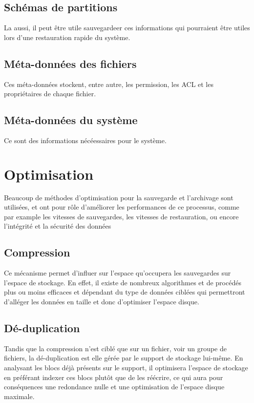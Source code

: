\documentclass[a4paper,11pt]{report}
\begin{document}
\subsection{Schémas de partitions}
La aussi, il peut être utile sauvegardeer ces informations qui pourraient être utiles lors d'une restauration rapide du système.

\subsection{Méta-données des fichiers}
Ces méta-données stockent, entre autre, les permission, les ACL et les propriétaires de chaque fichier. 

\subsection{Méta-données du système}
Ce sont des informations nécéessaires pour le système.

\section{Optimisation}
Beaucoup de méthodes d'optimisation pour la sauvegarde et l'archivage sont utilisées, et ont pour rôle d'améliorer les performances de ce processus, comme par example les vitesses de sauvegardes, les vitesses de restauration, ou encore l'intégrité et la sécurité des données

\subsection{Compression}
Ce mécanisme permet d'influer sur l'espace qu'occupera les sauvegardes sur l'espace de stockage. 
En effet, il existe de nombreux algorithmes et de procédés plus ou moins efficaces et dépendant du type de données ciblées qui permettront d'alléger les données en taille et donc d'optimiser l'espace disque.

\subsection{Dé-duplication}
Tandis que la compression n'est ciblé que sur un fichier, voir un groupe de fichiers, la dé-duplication est elle gérée par le support de stockage lui-même.
En analysant les blocs déjà présents sur le support, il optimisera l'espace de stockage en préférant indexer ces blocs plutôt que de les réécrire, ce qui aura pour conséquences une redondance nulle et une optimisation de l'espace disque maximale. 
\end{document}
